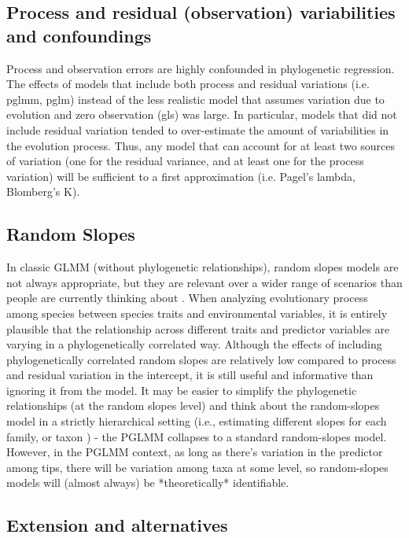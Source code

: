 \subsection{Process and residual (observation) variabilities and confoundings}

Process and observation errors are highly confounded in phylogenetic regression.
The effects of models that include both process and residual variations (i.e. pglmm, pglm) instead of the less realistic model that assumes variation due to evolution and zero observation (gls) was large. 
In particular, models that did not include residual variation tended to over-estimate the amount of variabilities in the evolution process. 
Thus, any model that can account for at least two sources of variation (one for the residual variance, and at least one for the process variation) will be sufficient to a first approximation (i.e. Pagel's lambda, Blomberg's K). 

\subsection{Random Slopes}

In classic GLMM (without phylogenetic relationships), random slopes models are not always appropriate, but they are relevant over a wider range of scenarios than people are currently thinking about \cite{schielzeth2013nested, cleasby2015quantifying}.
When analyzing evolutionary process among species between species traits and environmental variables, it is entirely plausible that the relationship across different traits and predictor variables are varying in a phylogenetically correlated way.
Although the effects of including phylogenetically correlated random slopes are relatively low compared to process and residual variation in the intercept, it is still useful and informative than ignoring it from the model.
It may be easier to simplify the phylogenetic relationships (at the random slopes level) and think about the random-slopes model in a strictly hierarchical setting (i.e., estimating different slopes for each family, or taxon \cite{ord2010adaptation}) - the PGLMM collapses to a standard random-slopes model. 
However, in the PGLMM context, as long as there's variation in the predictor among tips, there will be variation among taxa at some level, so random-slopes models will (almost always) be *theoretically* identifiable.

\subsection{Extension and alternatives}

